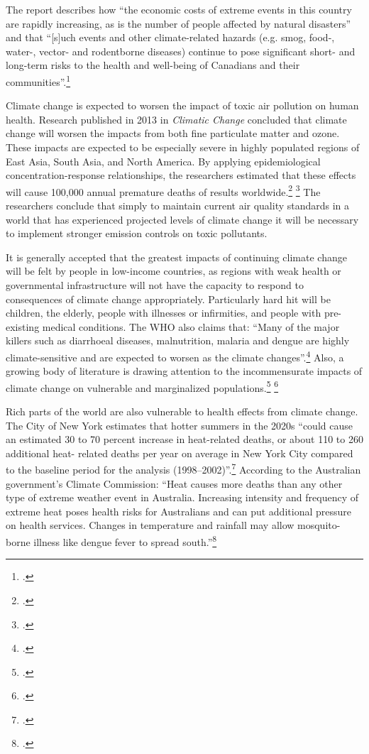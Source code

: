 The report describes how ``the economic costs of extreme events in this country are rapidly increasing, as is the number of people affected by natural disasters'' and that ``[s]uch events and other climate-related hazards (e.g. smog, food-, water-, vector- and rodentborne diseases) continue to pose significant short- and long-term risks to the health and well-being of Canadians and their communities''.\footcite[][p. 432]{HHInACC}



Climate change is expected to worsen the impact of toxic air pollution on human health.
Research published in 2013 in \emph{Climatic Change} concluded that climate change will worsen the impacts from both fine particulate matter and ozone.
These impacts are expected to be especially severe in highly populated regions of East Asia, South Asia, and North America.
By applying epidemiological concentration-response relationships, the researchers estimated that these effects will cause 100,000 annual premature deaths of results worldwide.\footcite[][]{Fang2013} \footcite[See also: ][]{CCAirPollution2013}
The researchers conclude that simply to maintain current air quality standards in a world that has experienced projected levels of climate change it will be necessary to implement stronger emission controls on toxic pollutants.



It is generally accepted that the greatest impacts of continuing climate change will be felt by people in low-income countries, as regions with weak health or governmental infrastructure will not have the capacity to respond to consequences of climate change appropriately. 
Particularly hard hit will be children, the elderly, people with illnesses or infirmities, and people with pre-existing medical conditions. 
The WHO also claims that: ``Many of the major killers such as diarrhoeal diseases, malnutrition, malaria and dengue are highly climate-sensitive and are expected to worsen as the climate changes''.\footcite[][]{WHOCCandHealth2012}
Also, a growing body of literature is drawing attention to the incommensurate impacts of climate change on vulnerable and marginalized populations.\footcite[][p. 1693--1733]{Costello2009} \footcite[][]{WHOSocialDeterm}



Rich parts of the world are also vulnerable to health effects from climate change.
The City of New York estimates that hotter summers in the 2020s ``could cause an estimated 30 to 70 percent increase in heat-related deaths, or about 110 to 260 additional heat- related deaths per year on average in New York City compared to the baseline period for the analysis (1998–2002)''.\footcite[][p. 31]{ResilientNewYork}
According to the Australian government's Climate Commission: ``Heat causes more deaths than any other type of extreme weather event in Australia. Increasing intensity and frequency of extreme heat poses health risks for Australians and can put additional pressure on health services. Changes in temperature and rainfall may allow mosquito-borne illness like dengue fever to spread south.''\footcite[][p. 4]{CriticalDecade2013}



